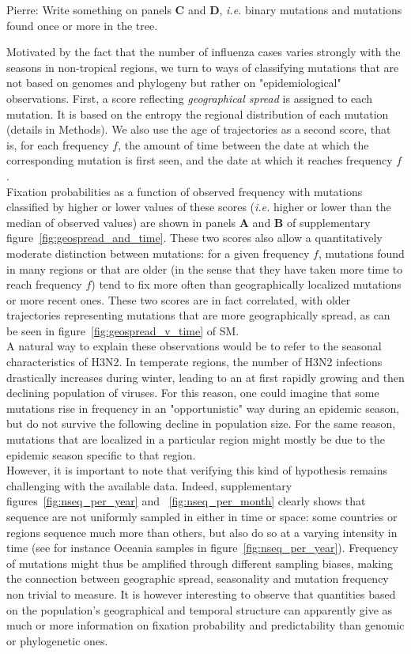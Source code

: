 \documentclass{article}
\newcommand{\pierre}[1]{{\color{red}Pierre: #1}}
\begin{document}
	\pierre{Write something on panels \textbf{C} and \textbf{D}, \emph{i.e.} binary mutations and mutations found once or more in the tree.}

	Motivated by the fact that the number of influenza cases varies strongly with the seasons in non-tropical regions, we turn to ways of classifying mutations that are not based on genomes and phylogeny but rather on "epidemiological" observations. First, a score reflecting \emph{geographical spread} is assigned to each mutation. It is based on the entropy the regional distribution of each mutation (details in Methods). We also use the age of trajectories as a second score, that is, for each frequency $f$, the amount of time between the date at which the corresponding mutation is first seen, and the date at which it reaches frequency $f$. \\
	Fixation probabilities as a function of observed frequency with mutations classified by higher or lower values of these scores (\emph{i.e.} higher or lower than the median of observed values) are shown in panels \textbf{A} and \textbf{B} of supplementary figure~\ref{fig:geospread_and_time}. These two scores also allow a quantitatively moderate distinction between mutations: for a given frequency $f$, mutations found in many regions or that are older (in the sense that they have taken more time to reach frequency $f$) tend to fix more often than geographically localized mutations or more recent ones. These two scores are in fact correlated, with older trajectories representing mutations that are more geographically spread, as can be seen in figure~\ref{fig:geospread_v_time} of SM. \\
	A natural way to explain these observations would be to refer to the seasonal characteristics of H3N2. In temperate regions, the number of H3N2 infections drastically increases during winter, leading to an at first rapidly growing and then declining population of viruses. For this reason, one could imagine that some mutations rise in frequency in an "opportunistic" way during an epidemic season, but do not survive the following decline in population size. For the same reason, mutations that are localized in a particular region might mostly be due to the epidemic season specific to that region. \\
	However, it is important to note that verifying this kind of hypothesis remains challenging with the available data. Indeed, supplementary figures~\ref{fig:nseq_per_year} and ~\ref{fig:nseq_per_month} clearly shows that sequence are not uniformly sampled in either in time or space: some countries or regions sequence much more than others, but also do so at a varying intensity in time (see for instance Oceania samples in figure~\ref{fig:nseq_per_year}). Frequency of mutations might thus be amplified through different sampling biases, making the connection between geographic spread, seasonality and mutation frequency non trivial to measure. It is however interesting to observe that quantities based on the population's geographical and temporal structure can apparently give as much or more information on fixation probability and predictability than genomic or phylogenetic ones. 
\end{document}
